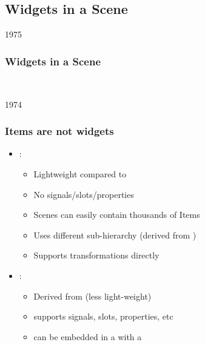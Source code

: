 %
%
%
%

\subsection{Widgets in a Scene}
\begin{slide}{1975}
\frametitle{Widgets in a Scene}
 \\
\end{slide}
\begin{slide}{1974}
\frametitle{Items are not widgets}
\begin{itemize}
\item {}:

    \begin{itemize}
    \item Lightweight compared to 

    \item No signals/slots/properties
    \item Scenes can easily contain thousands of Items
    \item Uses different  sub-hierarchy (derived from )

    \item Supports transformations directly
    \end{itemize}
\item {}:

    \begin{itemize}
    \item Derived from  (less light-weight)

    \item supports signals, slots, properties, etc
    \item can be embedded in a  with a 

    \end{itemize}
\end{itemize}
\end{slide}

